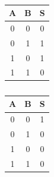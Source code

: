 \documentclass[11pt,a4paper]{article}
\begin{document}
\begin{table}[!htb]
  \caption*{}
    \begin{minipage}{.33\linewidth}
      \centering
        \caption{}
        \begin{tabular}{|c|c|c|}
		\hline 
		A & B & S \\ 
		\hline 
		0 & 0 & 0 \\ 
		\hline 
		0 & 1 & 1 \\ 
		\hline 
		1 & 0 & 1 \\ 
		\hline 
		1 & 1 & 0 \\ 
		\hline 
		\end{tabular} 
    \end{minipage}     
    \begin{minipage}{.33\linewidth}
      \centering
        \caption{}
        \begin{tabular}{|c|c|c|}
		\hline 
		A & B & S \\ 
		\hline 
		0 & 0 & 1 \\ 
		\hline 
		0 & 1 & 0 \\ 
		\hline 
		1 & 0 & 0 \\ 
		\hline 
		1 & 1 & 0 \\ 
		\hline 
		\end{tabular} 
    \end{minipage} 
\end{table}
\end{document}
